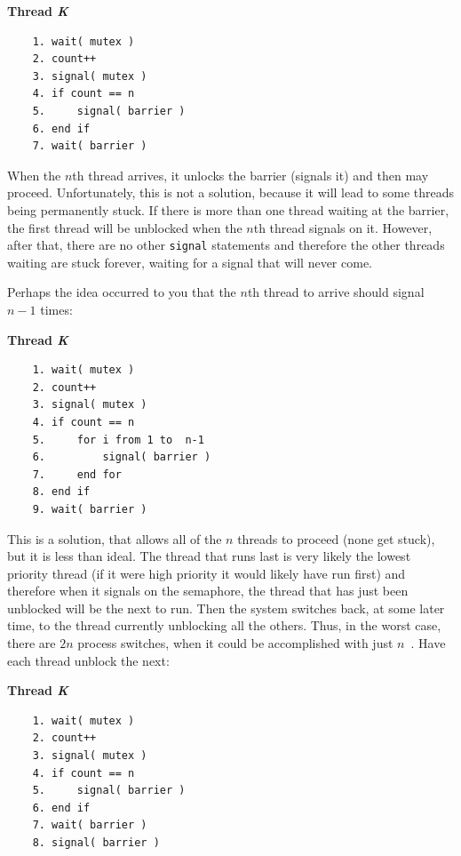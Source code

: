 \textbf{Thread \textit{K}}\vspace{-2em}
  \begin{verbatim}
	1. wait( mutex )
	2. count++
	3. signal( mutex )
	4. if count == n
	5.     signal( barrier )
	6. end if
	7. wait( barrier )
  \end{verbatim}
\vspace{-2em}

When the $n$th thread arrives, it unlocks the barrier (signals it) and then may proceed. Unfortunately, this is not a solution, because it will lead to some threads being permanently stuck. If there is more than one thread waiting at the barrier, the first thread will be unblocked when the $n$th thread signals on it. However, after that, there are no other \texttt{signal} statements and therefore the other threads waiting are stuck forever, waiting for a signal that will never come.

Perhaps the idea occurred to you that the $n$th thread to arrive should signal $n-1$ times:

\textbf{Thread \textit{K}}\vspace{-2em}
  \begin{verbatim}
	1. wait( mutex )
	2. count++
	3. signal( mutex )
	4. if count == n
	5.     for i from 1 to  n-1
	6.         signal( barrier )
	7.     end for
	8. end if
	9. wait( barrier )
  \end{verbatim}
\vspace{-2em} 

This is a solution, that allows all of the $n$ threads to proceed (none get stuck), but it is less than ideal. The thread that runs last is very likely the lowest priority thread (if it were high priority it would likely have run first) and therefore when it signals on the semaphore, the thread that has just been unblocked will be the next to run. Then the system switches back, at some later time, to the thread currently unblocking all the others. Thus, in the worst case, there are $2n$ process switches, when it could be accomplished with just $n$~\cite{mte241}. Have each thread unblock the next:

\textbf{Thread \textit{K}}\vspace{-2em}
  \begin{verbatim}
	1. wait( mutex )
	2. count++
	3. signal( mutex )
	4. if count == n
	5.     signal( barrier )
	6. end if
	7. wait( barrier )
	8. signal( barrier )
  \end{verbatim}
\vspace{-2em}

